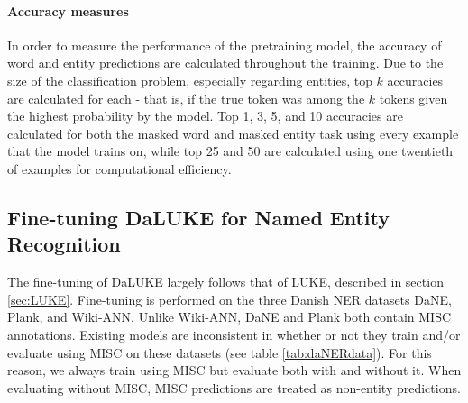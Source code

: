 \documentclass[main.tex]{subfiles}
\begin{document}
\paragraph{Accuracy measures}
In order to measure the performance of the pretraining model, the accuracy of word and entity predictions are calculated throughout the training.
Due to the size of the classification problem, especially regarding entities, top $ k $ accuracies are calculated for each - that is, if the true token was among the $ k $ tokens given the highest probability by the model.
Top 1, 3, 5, and 10 accuracies are calculated for both the masked word and masked entity task using every example that the model trains on, while top 25 and 50 are calculated using one twentieth of examples for computational efficiency.

\subsection{Fine-tuning DaLUKE for Named Entity Recognition}%
\label{sub:finetune-ner}
The fine-tuning of DaLUKE largely follows that of LUKE, described in section \ref{sec:LUKE}.
Fine-tuning is performed on the three Danish NER datasets DaNE, Plank, and Wiki-ANN.
Unlike Wiki-ANN, DaNE and Plank both contain MISC annotations.
Existing models are inconsistent in whether or not they train and/or evaluate using MISC on these datasets (see table \ref{tab:daNERdata}).
For this reason, we always train using MISC but evaluate both with and without it.
When evaluating without MISC, MISC predictions are treated as non-entity predictions.
\end{document}
